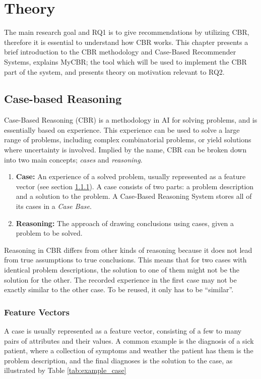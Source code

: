 \cleardoublepage

\chapter{Theory}
The main research goal and RQ1 is to give recommendations by utilizing CBR, therefore it is essential to understand how CBR works. This chapter presents a brief introduction to the CBR methodology and Case-Based Recommender Systems, explains MyCBR; the tool which will be used to implement the CBR part of the system, and presents theory on motivation relevant to RQ2.


\section{Case-based Reasoning}
Case-Based Reasoning (CBR) is a methodology in AI for solving problems, and is essentially based on experience. This experience can be used to solve a large range of problems, including complex combinatorial problems, or yield solutions where uncertainty is involved\cite{richter2013case}. Implied by the name, CBR can be broken down into two main concepts; \textit{cases} and \textit{reasoning}.

\begin{enumerate}
    \item \textbf{Case:} An experience of a solved problem, usually represented as a feature vector (see section \ref{sec:feature_vectors}). A case consists of two parts: a problem description and a solution to the problem. A Case-Based Reasoning System stores all of its cases in a \textit{Case Base}.
    \item \textbf{Reasoning:} The approach of drawing conclusions using cases, given a problem to be solved.
\end{enumerate}

Reasoning in CBR differs from other kinds of reasoning because it does not lead from true assumptions to true conclusions. This means that for two cases with identical problem descriptions, the solution to one of them might not be the solution for the other. The recorded experience in the first case may not be exactly similar to the other case. To be reused, it only has to be \enquote{similar}.

\subsection{Feature Vectors}\label{sec:feature_vectors}
A case is usually represented as a feature vector, consisting of a few to many pairs of attributes and their values. A common example is the diagnosis of a sick patient, where a collection of symptoms and weather the patient has them is the problem description, and the final diagnoses is the solution to the case, as illustrated by Table \ref{tab:example_case}

